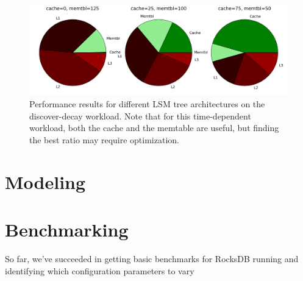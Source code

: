 \documentclass[11pt]{article}
\begin{document}
\begin{figure}[!htb]
\begin{center}
\includegraphics[width=\textwidth]{sameqs-difftree.png}
\end{center}
\caption{Performance results for different LSM tree architectures on the discover-decay workload. Note that for this time-dependent workload, both the cache and the memtable are useful, but finding the best ratio may require optimization.}
\label{fig:sameqs-difftree}
\end{figure}

\section{Modeling}


\section{Benchmarking}

So far, we've succeeded in getting basic benchmarks for RocksDB running and identifying which configuration parameters to vary


\small

\end{document}
